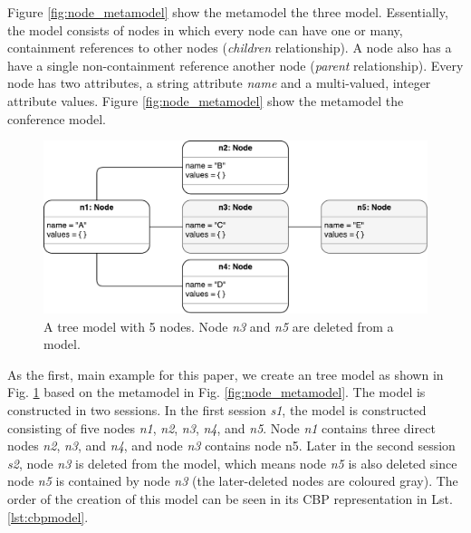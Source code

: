 \documentclass{llncs}
\begin{document}
Figure \ref{fig:node_metamodel} show the metamodel the three model. Essentially, the model consists of nodes in which every node can have one or many, containment references to other nodes (\emph{children} relationship). A node also has a have a single non-containment reference another node (\emph{parent} relationship). Every node has two attributes, a string attribute \emph{name} and a multi-valued, integer attribute {values}. Figure \ref{fig:node_metamodel} show the metamodel the conference model. 

\begin{figure}[ht]
\centering
\includegraphics[width=0.6\linewidth]{initial_chart}
\caption{A tree model with 5 nodes. Node \emph{n3} and \emph{n5} are deleted from a model.}
\label{fig:initial_model}
\end{figure}

As the first, main example for this paper, we create an tree model as shown in Fig. \ref{fig:initial_model} based on the metamodel in Fig. \ref{fig:node_metamodel}. The model is constructed in two sessions. In the first session \emph{s1}, the model is constructed consisting of five nodes \emph{n1}, \emph{n2}, \emph{n3}, \emph{n4}, and \emph{n5}. Node \emph{n1} contains three direct nodes \emph{n2}, \emph{n3}, and \emph{n4}, and node \emph{n3} contains node {n5}. Later in the second session \emph{s2}, node \emph{n3} is deleted from the model, which means node \emph{n5} is also deleted since node \emph{n5} is contained by node \emph{n3} (the later-deleted nodes are coloured gray). The order of the creation of this model can be seen in its CBP representation in Lst. \ref{lst:cbpmodel}.
\end{document}
